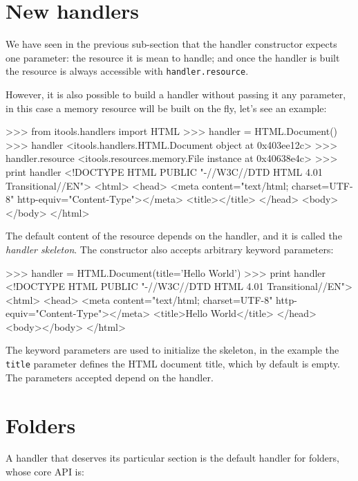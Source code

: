 \section{New handlers}

We have seen in the previous sub-section that the handler constructor expects
one parameter: the resource it is mean to handle; and once the handler is
built the resource is always accessible with {\tt handler.resource}.

However, it is also possible to build a handler without passing it any
parameter, in this case a memory resource will be built on the fly, let's
see an example:

\begin{code}
    >>> from itools.handlers import HTML
    >>> handler = HTML.Document()
    >>> handler
    <itools.handlers.HTML.Document object at 0x403ee12c>
    >>> handler.resource
    <itools.resources.memory.File instance at 0x40638e4c>
    >>> print handler
    <!DOCTYPE HTML PUBLIC "-//W3C//DTD HTML 4.01 Transitional//EN">
    <html>
      <head>
        <meta content="text/html; charset=UTF-8" http-equiv="Content-Type"></meta>
        <title></title>
      </head>
      <body></body>
    </html>
\end{code}

The default content of the resource depends on the handler, and it is called
the {\em handler skeleton}. The constructor also accepts arbitrary keyword
parameters:


\begin{code}
    >>> handler = HTML.Document(title='Hello World')
    >>> print handler
    <!DOCTYPE HTML PUBLIC "-//W3C//DTD HTML 4.01 Transitional//EN">
    <html>
      <head>
        <meta content="text/html; charset=UTF-8" http-equiv="Content-Type"></meta>
        <title>Hello World</title>
      </head>
      <body></body>
    </html>
\end{code}

The keyword parameters are used to initialize the skeleton, in the example
the {\tt title} parameter defines the HTML document title, which by default
is empty. The parameters accepted depend on the handler.



\section{Folders}

A handler that deserves its particular section is the default handler for
folders, whose core API is:

